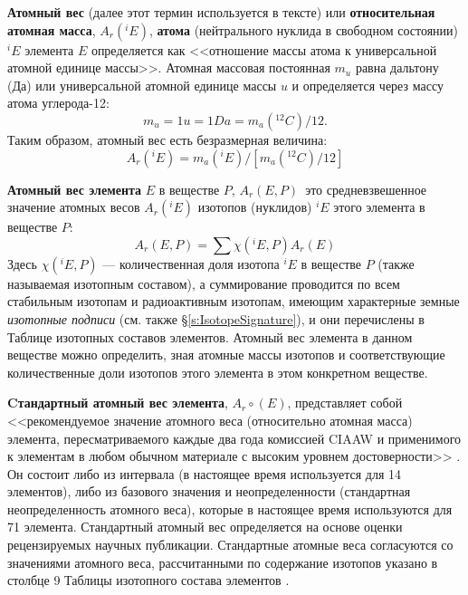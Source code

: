 \documentclass[a5paper,openany]{book}
\begin{document}
{\bf Атомный вес} (далее этот термин используется в тексте) или {\bf относительная атомная масса}, $A_r(^iE)$, {\bf атома} (нейтрального нуклида в свободном состоянии) $^iE $ элемента $E$ определяется как <<отношение массы атома к универсальной атомной единице массы>>.  
Атомная массовая постоянная $m_u$ равна дальтону (Да) или универсальной атомной единице массы $u$ и определяется через массу атома углерода-12: 
\begin{equation}
	m_u = 1 u = 1 Da = m_a(^{12}C)/12.
\end{equation}
Таким образом, атомный вес есть безразмерная величина:
\begin{equation} \label{ArE}
	A_r(^iE) = m_a(^{i}E)/ \left[ m_a(^{12}C)/12 \right] 
\end{equation}

{\bf Атомный вес элемента} $E$ в веществе $P$, $A_r(E, P)$ это средневзвешенное значение атомных весов
$A_r(^iE)$ изотопов (нуклидов) $^iE$ этого элемента в веществе $P$: 
\begin{equation}  \label{ArEP}
	A_r(E, P) = \sum \chi(^iE, P)A_r(E)
\end{equation}
Здесь $\chi(^iE, P)$ — количественная доля изотопа $^iE$ в веществе $P$ (также называемая изотопным составом), 
а суммирование проводится по всем стабильным изотопам и радиоактивным изотопам, имеющим характерные земные \emph{изотопные подписи} \cite{IPTEI} (см. также \S\ref{s:IsotopeSignature}),  и они перечислены в Таблице изотопных составов элементов. 
Атомный вес элемента в данном веществе можно определить, зная атомные массы изотопов и соответствующие количественные доли изотопов этого элемента в этом конкретном веществе.

{\bf Cтандартный атомный вес элемента}, $A_{r}{\circ}(E)$, представляет собой <<рекомендуемое значение атомного веса (относительно атомная масса) элемента, пересматриваемого каждые два года комиссией CIAAW и применимого к элементам в любом обычном материале 
с высоким уровнем достоверности>> \cite{IUPACGoldBook}. Он состоит либо из интервала (в настоящее время используется для 14 элементов), либо из базового значения и неопределенности (стандартная неопределенность атомного веса), которые в настоящее время используются для 71 элемента. Стандартный атомный вес определяется на основе оценки рецензируемых научных
публикации. Стандартные атомные веса согласуются со значениями атомного веса, рассчитанными по
содержание изотопов указано в столбце 9 Таблицы изотопного состава элементов \cite{IPTEI}. 
\end{document}
